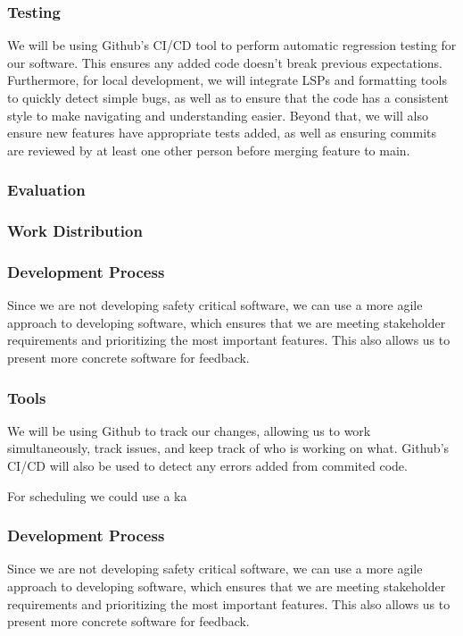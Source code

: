 \subsubsection{Testing}
We will be using Github's CI/CD tool to perform automatic regression testing for our software.
This ensures any added code doesn't break previous expectations.
Furthermore, for local development, we will integrate LSPs and formatting tools to quickly detect
simple bugs, as well as to ensure that the code has a consistent style to make navigating and understanding easier.
Beyond that, we will also ensure new features have appropriate tests added, as well as ensuring commits are
reviewed by at least one other person before merging feature to main.
\subsubsection{Evaluation}
\subsubsection{Work Distribution}
\subsubsection{Development Process}
Since we are not developing safety critical software, we can use a more agile approach
to developing software, which ensures that we are meeting stakeholder requirements and prioritizing
the most important features. This also allows us to present more concrete software for feedback.
\par 

\subsubsection{Tools}
We will be using Github to track our changes, allowing us to work simultaneously, 
track issues, and keep track of who is working on what. 
Github's CI/CD will also be used to detect any errors added from commited code.
\par
For scheduling we could use a ka\subsubsection{Development Process}
Since we are not developing safety critical software, we can use a more agile approach
to developing software, which ensures that we are meeting stakeholder requirements and prioritizing
the most important features. This also allows us to present more concrete software for feedback.
\par 
